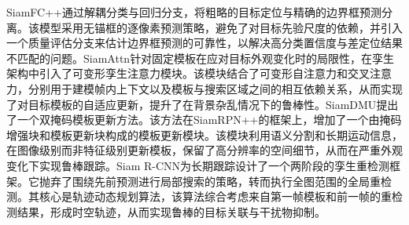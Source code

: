 SiamFC++\cite{Xu2020SiamFC++}通过解耦分类与回归分支，将粗略的目标定位与精确的边界框预测分离。该模型采用无锚框的逐像素预测策略，避免了对目标先验尺度的依赖，并引入一个质量评估分支来估计边界框预测的可靠性，以解决高分类置信度与差定位结果不匹配的问题。SiamAttn\cite{Yu2020SiamAttn}针对固定模板在应对目标外观变化时的局限性，在孪生架构中引入了可变形孪生注意力模块。该模块结合了可变形自注意力和交叉注意力，分别用于建模帧内上下文以及模板与搜索区域之间的相互依赖关系，从而实现了对目标模板的自适应更新，提升了在背景杂乱情况下的鲁棒性。SiamDMU\cite{Liu2024SiamDMU}提出了一个双掩码模板更新方法。该方法在SiamRPN++的框架上，增加了一个由掩码增强块和模板更新块构成的模板更新模块。该模块利用语义分割和长期运动信息，在图像级别而非特征级别更新模板，保留了高分辨率的空间细节，从而在严重外观变化下实现鲁棒跟踪。Siam R-CNN\cite{Voigtlaender2020SiamRCNN}为长期跟踪设计了一个两阶段的孪生重检测框架。它抛弃了围绕先前预测进行局部搜索的策略，转而执行全图范围的全局重检测。其核心是轨迹动态规划算法，该算法综合考虑来自第一帧模板和前一帧的重检测结果，形成时空轨迹，从而实现鲁棒的目标关联与干扰物抑制。


